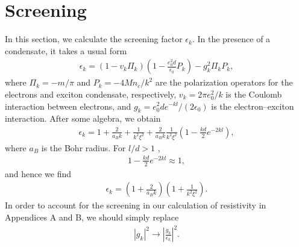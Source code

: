 %
%

\section{Screening}
In this section, we calculate the screening factor $\epsilon_k$. In the presence of a condensate, it takes a usual form~\cite{Fetter:1971aa}
%
\begin{eqnarray}
\epsilon_k=(1-v_k\Pi_k)\left(1-\frac{e_0^2d}{\epsilon_0}P_k\right)-g_k^2\Pi_kP_k,
\end{eqnarray}
%
where $\Pi_k=-m/\pi$ and $P_k=-4Mn_c/k^2$ are the polarization operators for the electrons and exciton condensate, respectively, $v_k=2\pi e_0^2/k$ is the Coulomb interaction between electrons, and $g_k=e_0^2de^{-kl}/(2\epsilon_0)$ is the electron--exciton interaction.
%
After some algebra, we obtain
%
\begin{eqnarray}
\epsilon_k=1+\frac{2}{a_Bk}+\frac{1}{k^2\xi^2}+\frac{2}{a_Bk}\frac{1}{k^2\xi^2}\left(1-\frac{kd}{2}e^{-2kl}\right),
\end{eqnarray}
%
where $a_B$ is the Bohr radius.
%
For $l/d>1$ ,
%
\begin{eqnarray}
1-\frac{kd}{2}e^{-2kl}\approx 1,
\end{eqnarray}
%
and hence we find
%
\begin{eqnarray}
\epsilon_k=\left(1+\frac{2}{a_Bk}\right)\left(1+\frac{1}{k^2\xi^2}\right).
\end{eqnarray}
%
In order to account for the screening in our calculation of resistivity in Appendices A and B, we should simply replace
%
\begin{eqnarray}
|g_k|^2\rightarrow\left|\frac{g_k}{\epsilon_k} \right|^2.
\end{eqnarray}
%

%
%
